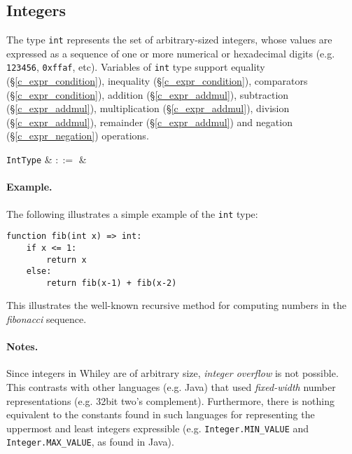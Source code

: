 \subsection{Integers}
\label{c_types_int}

The type \lstinline{int} represents the set of arbitrary-sized integers, whose values are expressed as a sequence of one or more numerical or hexadecimal digits (e.g. \lstinline{123456}, \lstinline{0xffaf}, etc).  Variables of \lstinline{int} type support equality (\S\ref{c_expr_condition}), inequality (\S\ref{c_expr_condition}), comparators (\S\ref{c_expr_condition}), addition (\S\ref{c_expr_addmul}), subtraction (\S\ref{c_expr_addmul}), multiplication (\S\ref{c_expr_addmul}), division (\S\ref{c_expr_addmul}), remainder (\S\ref{c_expr_addmul}) and negation (\S\ref{c_expr_negation}) operations.


\begin{syntax}
  \verb+IntType+ & $::=$ &  \\
\end{syntax}

\paragraph{Example.} The following illustrates a simple example of the \lstinline{int} type:

\begin{lstlisting}
function fib(int x) => int:
    if x <= 1:
        return x
    else:
        return fib(x-1) + fib(x-2)
\end{lstlisting}
This illustrates the well-known recursive method for computing numbers in the {\em fibonacci} sequence.

\paragraph{Notes.}  Since integers in Whiley are of arbitrary size, {\em integer overflow} is not possible.  This contrasts with other languages (e.g. Java) that used {\em fixed-width} number representations (e.g. 32bit two's complement).  Furthermore, there is nothing equivalent to the constants found in such languages for representing the uppermost and least integers expressible (e.g. \lstinline{Integer.MIN_VALUE} and \lstinline{Integer.MAX_VALUE}, as found in Java).

